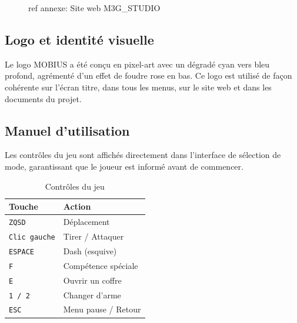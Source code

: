 \documentclass[12pt,a4paper]{article}
\begin{document}
\begin{figure}[H]
  \centering
  \caption{ref annexe: Site web M3G\_STUDIO}
\end{figure}

\subsection{Logo et identité visuelle}

Le logo MOBIUS a été conçu en pixel-art avec un dégradé cyan vers bleu profond, agrémenté d'un effet de foudre rose en bas. Ce logo est utilisé de façon cohérente sur l'écran titre, dans tous les menus, sur le site web et dans les documents du projet.


\subsection{Manuel d'utilisation}

Les contrôles du jeu sont affichés directement dans l'interface de sélection de mode, garantissant que le joueur est informé avant de commencer.

\begin{table}[H]
\centering
\caption{Contrôles du jeu}
\renewcommand{\arraystretch}{1.35}
\begin{tabular}{@{}ll@{}}
\toprule
\rowcolor{tableheadbg}
\textbf{Touche} & \textbf{Action} \\
\midrule
\texttt{ZQSD}        & Déplacement \\
\rowcolor{rowaltbg}
\texttt{Clic gauche} & Tirer / Attaquer \\
\texttt{ESPACE}      & Dash (esquive) \\
\rowcolor{rowaltbg}
\texttt{F}           & Compétence spéciale \\
\texttt{E}           & Ouvrir un coffre \\
\rowcolor{rowaltbg}
\texttt{1 / 2}       & Changer d'arme \\
\texttt{ESC}         & Menu pause / Retour \\
\bottomrule
\end{tabular}
\end{table}

\newpage
\end{document}

